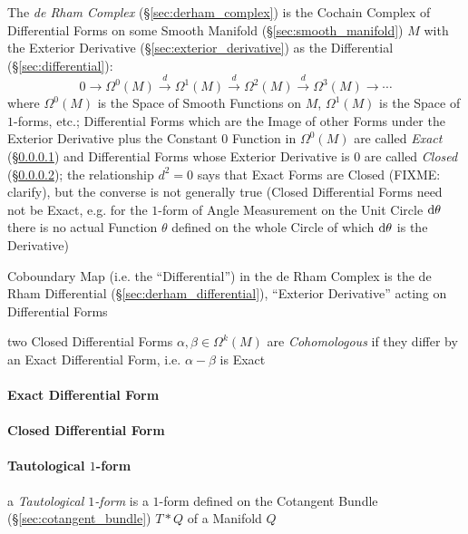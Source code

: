 The \emph{de Rham Complex} (\S\ref{sec:derham_complex}) is the Cochain Complex
of Differential Forms on some Smooth Manifold (\S\ref{sec:smooth_manifold}) $M$
with the Exterior Derivative (\S\ref{sec:exterior_derivative}) as the
Differential (\S\ref{sec:differential}):
\[
  0 \rightarrow \Omega^0(M) \xrightarrow{d} \Omega^1(M) \xrightarrow{d}
  \Omega^2(M) \xrightarrow{d} \Omega^3(M) \rightarrow \cdots
\]
where $\Omega^0(M)$ is the Space of Smooth Functions on $M$, $\Omega^1(M)$ is
the Space of $1$-forms, etc.; Differential Forms which are the Image of other
Forms under the Exterior Derivative plus the Constant $0$ Function in
$\Omega^0(M)$ are called \emph{Exact} (\S\ref{sec:exact_differential_form}) and
Differential Forms whose Exterior Derivative is $0$ are called \emph{Closed}
(\S\ref{sec:closed_differential_form}); the relationship $d^2 = 0$ says that
Exact Forms are Closed (FIXME: clarify), but the converse is not generally true
(Closed Differential Forms need not be Exact, e.g. for the $1$-form of Angle
Measurement on the Unit Circle $\mathrm{d}\theta$ there is no actual Function
$\theta$ defined on the whole Circle of which $\mathrm{d}\theta$ is the
Derivative)

Coboundary Map (i.e. the ``Differential'') in the de Rham Complex is the de Rham
Differential (\S\ref{sec:derham_differential}), ``Exterior Derivative'' acting
on Differential Forms

two Closed Differential Forms $\alpha, \beta \in \Omega^k(M)$ are
\emph{Cohomologous} if they differ by an Exact Differential Form, i.e. $\alpha -
\beta$ is Exact



\paragraph{Exact Differential Form}\label{sec:exact_differential_form}\hfill

\paragraph{Closed Differential Form}\label{sec:closed_differential_form}\hfill

\paragraph{Tautological $1$-form}\label{sec:tautological_1form}\hfill

a \emph{Tautological $1$-form} is a $1$-form defined on the Cotangent Bundle
(\S\ref{sec:cotangent_bundle}) $T * Q$ of a Manifold $Q$

